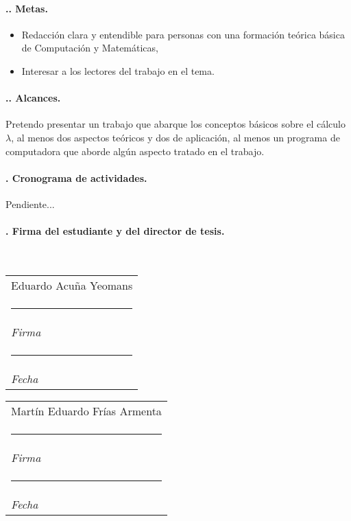 \documentclass[12pt,letterpaper]{article}
\makeatletter
\newcommand{\RomanNumeral}[1]{\uppercase\expandafter{\romannumeral #1\relax}}
\newcommand{\namesigdate}[2][6cm]{%
  \begin{tabular}{@{}p{#1}@{}}
    #2 \\[2\normalbaselineskip] \hrule \\[0pt]
    {\small \textit{Firma}} \\[2\normalbaselineskip] \hrule \\[0pt]
    {\small \textit{Fecha}}
  \end{tabular}
}
\newcommand{\estudiante}{Eduardo Acuña Yeomans}
\newcommand{\director}{Martín Eduardo Frías Armenta}
\makeatother
\begin{document}
\paragraph{\RomanNumeral{5}.\RomanNumeral{3}. Metas.}
\begin{itemize}
\item Redacción clara y entendible para personas con una formación teórica básica de Computación y Matemáticas,
\item Interesar a los lectores del trabajo en el tema.
\end{itemize}

\paragraph{\RomanNumeral{5}.\RomanNumeral{4}. Alcances.} Pretendo presentar un trabajo que abarque los conceptos básicos sobre el cálculo \( λ \), al menos dos aspectos teóricos y dos de aplicación, al menos un programa de computadora que aborde algún aspecto tratado en el trabajo.

\paragraph{\RomanNumeral{6}. Cronograma de actividades.} Pendiente...

\paragraph{\RomanNumeral{7}. Firma del estudiante y del director de tesis.}\

\vspace*{50pt}

\noindent \namesigdate{\estudiante} \hfill \namesigdate{\director}
\end{document}
